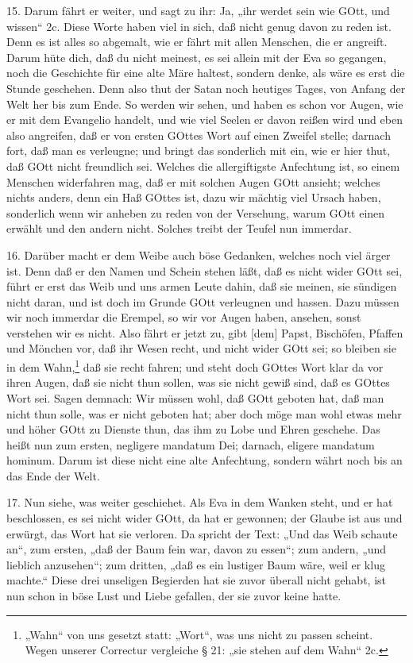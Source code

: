 15. Darum fährt er weiter, und sagt zu ihr: Ja, „ihr werdet sein wie GOtt, und wissen“ 2c. Diese Worte haben viel in sich, daß nicht genug davon zu reden ist. Denn es ist alles so abgemalt, wie er fährt mit allen Menschen, die er angreift. Darum hüte dich, daß du nicht meinest, es sei allein mit der Eva so gegangen, noch die Geschichte für eine alte Märe haltest, sondern denke, als wäre es erst die Stunde geschehen. Denn also thut der Satan noch heutiges Tages, von Anfang der Welt her bis zum Ende. So werden wir sehen, und haben es schon vor Augen, wie er mit dem Evangelio handelt, und wie viel Seelen er davon reißen wird und eben also angreifen, daß er von ersten GOttes Wort auf einen Zweifel stelle; darnach fort, daß man es verleugne; und bringt das sonderlich mit ein, wie er hier thut, daß GOtt nicht freundlich sei. Welches die allergiftigste Anfechtung ist, so einem Menschen widerfahren mag, daß er mit solchen Augen GOtt ansieht; welches nichts anders, denn ein Haß GOttes ist, dazu wir mächtig viel Ursach haben, sonderlich wenn wir anheben zu reden von der Versehung, warum GOtt einen erwählt und den andern nicht. Solches treibt der Teufel nun immerdar.

16. Darüber macht er dem Weibe auch böse Gedanken, welches noch viel ärger ist. Denn daß er den Namen und Schein stehen läßt, daß es nicht wider GOtt sei, führt er erst das Weib und uns armen Leute dahin, daß sie meinen, sie sündigen nicht daran, und ist doch im Grunde GOtt verleugnen und hassen. Dazu müssen wir noch immerdar die Erempel, so wir vor Augen haben, ansehen, sonst verstehen wir es nicht. Also fährt er jetzt zu, gibt [dem] Papst, Bischöfen, Pfaffen und Mönchen vor, daß ihr Wesen recht, und nicht wider GOtt sei; so bleiben sie in dem Wahn,\footnote{„Wahn“ von uns gesetzt statt: „Wort“, was uns nicht zu passen scheint. Wegen unserer Correctur vergleiche § 21: „sie stehen auf dem Wahn“ 2c.} daß sie recht fahren; und steht doch GOttes Wort klar da vor ihren Augen, daß sie nicht thun sollen, was sie nicht gewiß sind, daß es GOttes Wort sei. Sagen demnach: Wir müssen wohl, daß GOtt geboten hat, daß man nicht thun solle, was er nicht geboten hat; aber doch möge man wohl etwas mehr und höher GOtt zu Dienste thun, das ihm zu Lobe und Ehren geschehe. Das heißt nun zum ersten, negligere mandatum Dei; darnach, eligere mandatum hominum. Darum ist diese nicht eine alte Anfechtung, sondern währt noch bis an das Ende der Welt.

17. Nun siehe, was weiter geschiehet. Als Eva in dem Wanken steht, und er hat beschlossen, es sei nicht wider GOtt, da hat er gewonnen; der Glaube ist aus und erwürgt, das Wort hat sie verloren. Da spricht der Text: „Und das Weib schaute an“, zum ersten, „daß der Baum fein war, davon zu essen“; zum andern, „und lieblich anzusehen“; zum dritten, „daß es ein lustiger Baum wäre, weil er klug machte.“ Diese drei unseligen Begierden hat sie zuvor überall nicht gehabt, ist nun schon in böse Lust und Liebe gefallen, der sie zuvor keine hatte.

